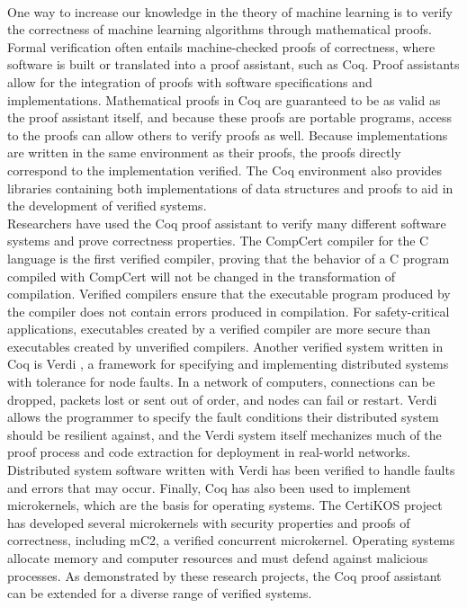 \\One way to increase our knowledge in the theory of machine learning is to verify the correctness of machine learning algorithms through mathematical proofs. Formal verification often entails machine-checked proofs of correctness, where software is built or translated into a proof assistant, such as Coq. Proof assistants allow for the integration of proofs with software specifications and implementations. Mathematical proofs in Coq are guaranteed to be as valid as the proof assistant itself, and because these proofs are portable programs, access to the proofs can allow others to verify proofs as well. Because implementations are written in the same environment as their proofs, the proofs directly correspond to the implementation verified. The Coq environment also provides libraries containing both implementations of data structures and proofs to aid in the development of verified systems.
\\Researchers have used the Coq proof assistant to verify many different software systems and prove correctness properties. The CompCert compiler for the C language \cite{Ler09} is the first verified compiler, proving that the behavior of a C program compiled with CompCert will not be changed in the transformation of compilation. Verified compilers ensure that the executable program produced by the compiler does not contain errors produced in compilation. For safety-critical applications, executables created by a verified compiler are more secure than executables created by unverified compilers. Another verified system written in Coq is Verdi \cite{WWP15}, a framework for specifying and implementing distributed systems with tolerance for node faults. In a network of computers, connections can be dropped, packets lost or sent out of order, and nodes can fail or restart. Verdi allows the programmer to specify the fault conditions their distributed system should be resilient against, and the Verdi system itself mechanizes much of the proof process and code extraction for deployment in real-world networks. Distributed system software written with Verdi has been verified to handle faults and errors that may occur. Finally, Coq has also been used to implement microkernels, which are the basis for operating systems. The CertiKOS project \cite{GSC16} has developed several microkernels with security properties and proofs of correctness, including mC2, a verified concurrent microkernel. Operating systems allocate memory and computer resources and must defend against malicious processes. As demonstrated by these research projects, the Coq proof assistant can be extended for a diverse range of verified systems.
